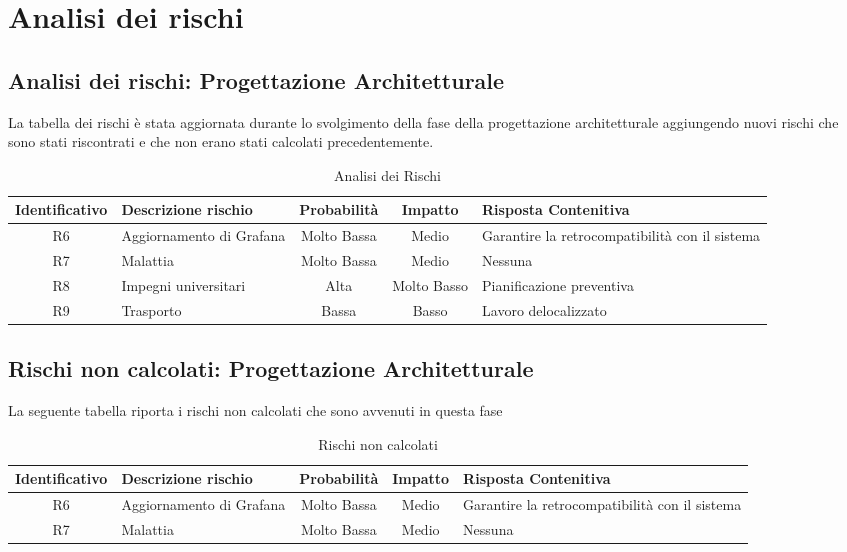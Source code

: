 \section{Analisi dei rischi}
\subsection{Analisi dei rischi: Progettazione Architetturale}
La tabella dei rischi è stata aggiornata durante lo svolgimento della fase della progettazione architetturale aggiungendo nuovi rischi che sono stati riscontrati e che non erano stati calcolati precedentemente.
\begin{table}[!htpb]
		\centering
		\renewcommand{\arraystretch}{2} 
		\begin{tabular}{|c|p{3.6cm}|c|c|p{3.6cm}|}
			\rowcolor{orange!50}
			\hline
			\textbf{Identificativo} & \textbf{Descrizione rischio} & \textbf{Probabilità} & \textbf{Impatto} & \textbf{Risposta Contenitiva}\\
            \hline
			R6 & Aggiornamento di Grafana & Molto Bassa & Medio & Garantire la retrocompatibilità con il sistema\\
			\hline
			R7 & Malattia & Molto Bassa & Medio & Nessuna\\
			\hline
			R8 & Impegni universitari & Alta & Molto Basso & Pianificazione preventiva\\
			\hline
			R9 & Trasporto & Bassa & Basso & Lavoro delocalizzato\\
			\hline
		\end{tabular}
		\caption{Analisi dei Rischi}
	\end{table}
\newpage
\subsection{Rischi non calcolati: Progettazione Architetturale}
La seguente tabella riporta i rischi non calcolati che sono avvenuti in questa fase
\begin{table}[!htpb]
		\centering
		\renewcommand{\arraystretch}{2} 
		\rowcolors{2}{gray!25}{white}
		\begin{tabular}{|c|p{3.6cm}|c|c|p{3.6cm}|}
			\rowcolor{orange!50}
			\hline
			\textbf{Identificativo} & \textbf{Descrizione rischio} & \textbf{Probabilità} & \textbf{Impatto} & \textbf{Risposta Contenitiva}\\
            \hline
			R6 & Aggiornamento di Grafana & Molto Bassa & Medio & Garantire la retrocompatibilità con il sistema\\
			\hline
			R7 & Malattia & Molto Bassa & Medio & Nessuna\\
			\hline
		\end{tabular}
		\caption{Rischi non calcolati}
	\end{table}